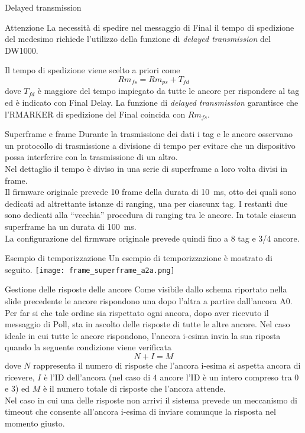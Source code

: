 \begin{frame}[label={delayed_tx}]{Delayed transmission}
  \begin{alertblock}{Attenzione}
    La necessità di spedire nel messaggio di Final il tempo di spedizione del medesimo richiede
    l'utilizzo della funzione di \emph{delayed transmission} del DW1000.
  \end{alertblock}
  Il tempo di spedizione viene scelto a priori come
  \[
  Rm_{fs} = Rm_{ps} + T_{fd}
  \]
  dove $T_{fd}$ è maggiore del tempo impiegato da \alert{tutte le ancore} per rispondere al tag ed è indicato
  con Final Delay.
  La funzione di \emph{delayed transmission} garantisce che l'RMARKER di spedizione del Final coincida con
  $Rm_{fs}$.
\end{frame}

\begin{frame}{Superframe e frame}
  Durante la trasmissione dei dati i tag e le ancore osservano un protocollo di trasmissione
  \alert{a divisione di tempo} per evitare che un dispositivo possa interferire con la trasmissione
  di un altro.\\
  Nel dettaglio il tempo è diviso in una serie di \alert{superframe} a loro volta divisi in
  frame.\\
  Il firmware originale prevede 10 frame della durata di \SI{10}{\milli\second}, otto dei quali
  sono dedicati ad altrettante istanze di ranging, una per ciascunx tag. I restanti due sono dedicati
  alla ``vecchia'' procedura di ranging tra le ancore. In totale ciascun superframe ha un durata di \SI{100}{\milli\second}.\\
  La configurazione del firmware originale prevede quindi fino a $8$ tag e $3$/$4$ ancore.
\end{frame}

\begin{frame}{Esempio di temporizzazione}
  Un esempio di temporizzazione è mostrato di seguito.
  \centering
  \texttt{[image: frame\_superframe\_a2a.png]}
\end{frame}

\begin{frame}[shrink=10, label={anchors_responses_turn}]{Gestione delle risposte delle ancore}
  Come visibile dallo schema riportato nella slide precedente le ancore rispondono una dopo l'altra a partire
  dall'ancora A0.\\
  Per far si che tale ordine sia rispettato ogni ancora, dopo aver ricevuto il messaggio di Poll, sta in ascolto
  delle risposte di tutte le altre ancore. Nel caso ideale in cui tutte le ancore rispondono, l'ancora i-esima
  invia la sua riposta quando la seguente condizione viene verificata
  \[
  N + I = M
  \]
  dove $N$ rappresenta il numero di risposte che l'ancora i-esima si aspetta ancora di ricevere,
  $I$ è l'ID dell'ancora (nel caso di $4$ ancore l'ID è un intero compreso tra $0$ e $3$) ed $M$
  è il numero totale di risposte che l'ancora attende.\\
  Nel caso in cui una delle risposte non arrivi il sistema prevede un meccanismo di timeout che consente
  all'ancora i-esima di inviare comunque la risposta nel momento giusto.
\end{frame}


